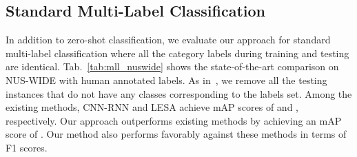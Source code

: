 \documentclass[10pt,journal,compsoc]{IEEEtran}
\begin{document}
\begin{table}[t]
\centering
\caption{Standard multi-label classification performance comparison on NUS-WIDE. The results are reported in terms of mAP and F1 score at . Our approach achieves superior performance compared to existing methods. Best results are in bold.}
\label{tab:mll_nuswide}
\end{table}






\subsection{Standard Multi-Label Classification\label{sec:stnd_ML_suppl}}
In addition to zero-shot classification, we evaluate our approach for standard multi-label classification where all the category labels during training and testing are identical. Tab.~\ref{tab:mll_nuswide} shows the state-of-the-art comparison on NUS-WIDE with  human annotated labels. As in~\cite{huynh2020shared}, we remove all the testing instances that do not have any classes corresponding to the  labels set. 
Among the existing methods, CNN-RNN and LESA achieve mAP scores of  and , respectively. Our approach outperforms existing methods by achieving an mAP score of . Our method also performs favorably against these methods in terms of F1 scores. 
\end{document}
